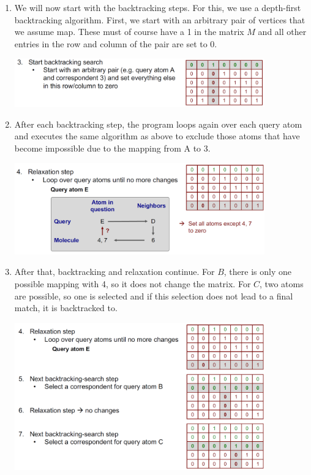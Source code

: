 \begin{enumerate}
    \item We will now start with the backtracking steps. For this, we use a depth-first backtracking algorithm. First, we start with an arbitrary pair of vertices that we assume map. These must of course have a 1 in the matrix $M$ and all other entries in the row and column of the pair are set to 0.
    \begin{center}\includegraphics[width=0.85\textwidth]{img/cheminformatics/UllmannBacktrackingA.png}\end{center}
    \item After each backtracking step, the program loops again over each query atom and executes the same algorithm as above to exclude those atoms that have become impossible due to the mapping from A to 3.
    \begin{center}\includegraphics[width=0.85\textwidth]{img/cheminformatics/UllmannBacktrackingAr.png}\end{center}
    \item After that, backtracking and relaxation continue. For $B$, there is only one possible mapping with 4, so it does not change the matrix. For $C$, two atoms are possible, so one is selected and if this selection does not lead to a final match, it is backtracked to.
    \begin{center}\includegraphics[width=0.85\textwidth]{img/cheminformatics/UllmannBacktrackingB.png}\end{center}

\end{enumerate}
